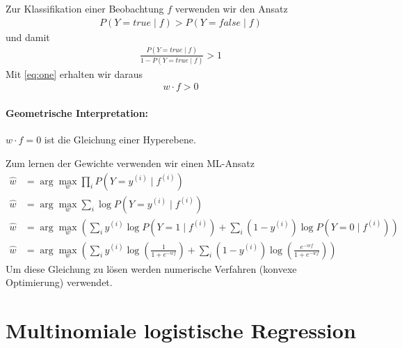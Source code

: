 Zur Klassifikation einer Beobachtung $f$ verwenden wir den Ansatz
\begin{align*}
    P(Y=true \mid f)> P(Y=false \mid f)
\end{align*}
und damit
\begin{align*}
    \frac{P(Y=true\mid f)}{1-P(Y=true\mid f)} > 1
\end{align*}
Mit \cref{eq:one} erhalten wir daraus
\begin{align*}
    w\cdot f>0
\end{align*}
\paragraph{Geometrische Interpretation:}
\label{par:geometrische_interpretation_}

$w\cdot f=0$ ist die Gleichung einer Hyperebene.

Zum lernen der Gewichte verwenden wir einen ML-Ansatz
\begin{align*}
    \hat w & = \arg\max_w \prod\limits_i P(Y=y^{(i)}\mid f^{(i)})\\
    \hat w & = \arg\max_w \sum\limits_i \log P(Y=y^{(i)}\mid f^{(i)})\\
    \hat w & = \arg\max_w \left(\sum\limits_i y^{(i)}\log P(Y=1\mid
        f^{(i)}) + \sum\limits_i (1-y^{(i)})\log P(Y=0\mid f^{(i)})\right)\\
    \hat w & = \arg\max_w \left(\sum\limits_i y^{(i)} \log
    \left(\frac{1}{1+e^{-wf}}\right)+
    \sum\limits_i (1-y^{(i)}) \log \left(\frac{e^{-wf}}{1+e^{-wf}}\right)\right)
\end{align*}
Um diese Gleichung zu lösen werden numerische Verfahren (konvexe Optimierung)
verwendet.

\section{Multinomiale logistische Regression}
\label{sec:multinomiale_logistische_regression}

